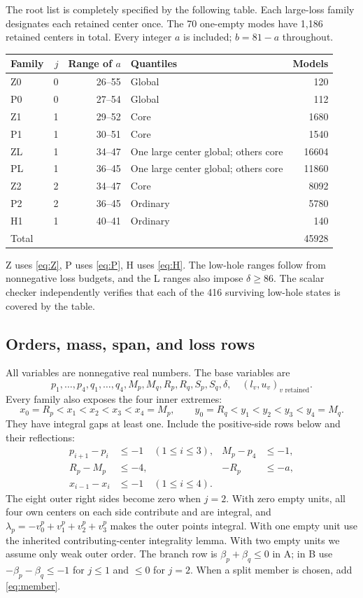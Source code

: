 \documentclass[11pt,a4paper]{article}
\begin{document}
The root list is completely specified by the following table. Each
large-loss family designates each retained center once. The 70 one-empty
modes have 1,186 retained centers in total. Every integer $a$ is included;
$b=81-a$ throughout.
\begin{center}\small
\begin{tabular}{lrrlr}
\toprule
Family&$j$&Range of $a$&Quantiles&Models\\
\midrule
Z0&0&26--55&Global&120\\
P0&0&27--54&Global&112\\
Z1&1&29--52&Core&1680\\
P1&1&30--51&Core&1540\\
ZL&1&34--47&One large center global; others core&16604\\
PL&1&36--45&One large center global; others core&11860\\
Z2&2&34--47&Core&8092\\
P2&2&36--45&Ordinary&5780\\
H1&1&40--41&Ordinary&140\\
\midrule
Total&&&&45928\\
\bottomrule
\end{tabular}
\end{center}
Z uses \eqref{eq:Z}, P uses \eqref{eq:P}, H uses \eqref{eq:H}.
The low-hole ranges follow from nonnegative loss budgets, and the L ranges
also impose $\delta\ge86$. The scalar checker independently verifies
that each of the 416 surviving low-hole states is covered by the table.

\subsection{Orders, mass, span, and loss rows}
All variables are nonnegative real numbers. The base variables are
\[
 p_1,\ldots,p_4,q_1,\ldots,q_4,M_p,M_q,R_p,R_q,S_p,S_q,\delta,
 \quad(l_v,u_v)_{v\text{ retained}}.
\]
Every family also exposes the four inner extremes:
\[
 x_0=R_p<x_1<x_2<x_3<x_4=M_p,
 \qquad y_0=R_q<y_1<y_2<y_3<y_4=M_q.
\]
They have integral gaps at least one. Include the positive-side rows
below and their reflections:
\begin{align*}
 p_{i+1}-p_i&\le-1\quad(1\le i\le3),&M_p-p_4&\le-1,\\
 R_p-M_p&\le-4,&-R_p&\le-a,\\
 x_{i-1}-x_i&\le-1\quad(1\le i\le4).&&
\end{align*}
The eight outer right sides become zero when $j=2$.
With zero empty units, all four own centers on each side contribute and
are integral, and
$\lambda_p=-v^p_0+v^p_1+v^p_2+v^p_3$ makes the outer points integral.
With one empty unit use the inherited contributing-center integrality
lemma. With two empty units we assume only weak outer order.
The branch row is $\beta_p+\beta_q\le0$ in A;
in B use $-\beta_p-\beta_q\le-1$ for $j\le1$ and $\le0$ for $j=2$.
When a split member is chosen, add \eqref{eq:member}.
\end{document}

